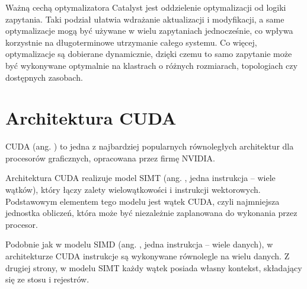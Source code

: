 Ważną cechą optymalizatora Catalyst jest oddzielenie optymalizacji od logiki zapytania. Taki
podział ułatwia wdrażanie aktualizacji i modyfikacji, a same optymalizacje mogą być używane
w wielu zapytaniach jednocześnie, co wpływa korzystnie na długoterminowe utrzymanie całego
systemu. Co więcej, optymalizacje są dobierane dynamicznie, dzięki czemu to samo zapytanie
może być wykonywane optymalnie na klastrach o różnych rozmiarach, topologiach czy
dostępnych zasobach.

\section{Architektura CUDA}

CUDA (ang. ) to jedna z najbardziej popularnych
równoległych architektur dla procesorów graficznych, opracowana przez firmę NVIDIA.

Architektura CUDA realizuje model SIMT \cite{computer-arch} (ang. ,
jedna instrukcja -- wiele wątków), który łączy zalety wielowątkowości i instrukcji wektorowych.
Podstawowym elementem tego modelu jest wątek CUDA, czyli najmniejsza jednostka obliczeń, która
może być niezależnie zaplanowana do wykonania przez procesor.

Podobnie jak w modelu SIMD (ang. , jedna instrukcja -- wiele danych),
w architekturze CUDA instrukcje są wykonywane równolegle na wielu danych. Z drugiej strony,
w modelu SIMT każdy wątek posiada własny kontekst, składający się ze stosu i rejestrów.

